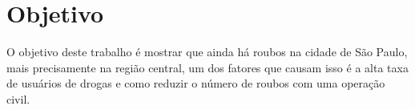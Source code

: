 \section{Objetivo}

    O objetivo deste trabalho é mostrar que ainda há roubos na cidade
    de São Paulo, mais precisamente na região central, um dos fatores que
    causam isso é a alta taxa de usuários de drogas e como reduzir o número
    de roubos com uma operação civil.